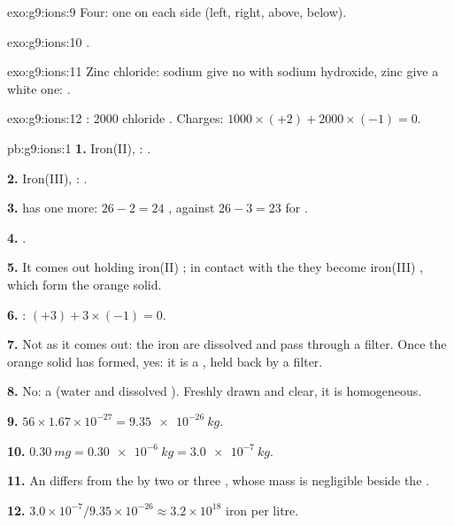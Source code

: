 \begin{solution}{exo:g9:ions:9}
Four: one on each side (left, right, above, below).
\end{solution}

\begin{solution}{exo:g9:ions:10}
.
\end{solution}

\begin{solution}{exo:g9:ions:11}
Zinc chloride: sodium  give no  with sodium hydroxide,
zinc  give a white one:
.
\end{solution}

\begin{solution}{exo:g9:ions:12}
: 2000 chloride . Charges: $1000 \times (+2) + 2000 \times
(-1) = 0$.
\end{solution}

\begin{solution}{pb:g9:ions:1}
\textbf{1.} Iron(II), : .

\textbf{2.} Iron(III), : .

\textbf{3.}  has one more: $26 - 2 = 24$ , against
$26 - 3 = 23$ for .

\textbf{4.} .

\textbf{5.} It comes out holding iron(II) ; in contact with the 
they become iron(III) , which form the orange solid.

\textbf{6.} : $(+3) + 3 \times (-1) = 0$.

\textbf{7.} Not as it comes out: the iron  are dissolved and pass
through a filter. Once the orange solid has formed, yes: it is a
, held back by a filter.

\textbf{8.} No: a  (water and dissolved ). Freshly drawn and
clear, it is homogeneous.

\textbf{9.} $56 \times 1.67 \times 10^{-27} = \qty{9.35e-26}{kg}$.

\textbf{10.} $\qty{0.30}{mg} = \qty{0.30e-6}{kg} = \qty{3.0e-7}{kg}$.

\textbf{11.} An  differs from the  by two or three ,
whose mass is negligible beside the .

\textbf{12.} $3.0 \times 10^{-7} / 9.35 \times 10^{-26} \approx 3.2
\times 10^{18}$ iron  per litre.
\end{solution}
